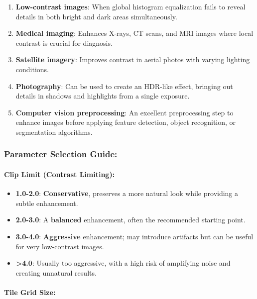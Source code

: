 \documentclass[11pt]{article}
\providecommand{\tightlist}{%
      \setlength{\itemsep}{0pt}\setlength{\parskip}{0pt}}
\begin{document}
\begin{enumerate}
\def\labelenumi{\arabic{enumi}.}
\tightlist
\item
  \textbf{Low-contrast images}: When global histogram equalization fails
  to reveal details in both bright and dark areas simultaneously.
\item
  \textbf{Medical imaging}: Enhances X-rays, CT scans, and MRI images
  where local contrast is crucial for diagnosis.
\item
  \textbf{Satellite imagery}: Improves contrast in aerial photos with
  varying lighting conditions.
\item
  \textbf{Photography}: Can be used to create an HDR-like effect,
  bringing out details in shadows and highlights from a single exposure.
\item
  \textbf{Computer vision preprocessing}: An excellent preprocessing
  step to enhance images before applying feature detection, object
  recognition, or segmentation algorithms.
\end{enumerate}

\hypertarget{parameter-selection-guide}{%
\subsubsection{Parameter Selection
Guide:}\label{parameter-selection-guide}}

\hypertarget{clip-limit-contrast-limiting}{%
\paragraph{Clip Limit (Contrast
Limiting):}\label{clip-limit-contrast-limiting}}

\begin{itemize}
\tightlist
\item
  \textbf{1.0-2.0}: \textbf{Conservative}, preserves a more natural look
  while providing a subtle enhancement.
\item
  \textbf{2.0-3.0}: A \textbf{balanced} enhancement, often the
  recommended starting point.
\item
  \textbf{3.0-4.0}: \textbf{Aggressive} enhancement; may introduce
  artifacts but can be useful for very low-contrast images.
\item
  \textbf{\textgreater4.0}: Usually too aggressive, with a high risk of
  amplifying noise and creating unnatural results.
\end{itemize}

\hypertarget{tile-grid-size}{%
\paragraph{Tile Grid Size:}\label{tile-grid-size}}
\end{document}
